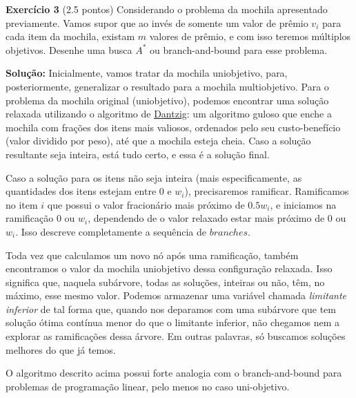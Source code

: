 \noindent \textbf{Exercício 3} (2.5 pontos) Considerando o problema da mochila apresentado
previamente. Vamos supor que ao invés de somente um valor de prêmio
$v_i$ para cada item da mochila, existam $m$ valores de prêmio, e com isso
teremos múltiplos objetivos. Desenhe uma busca $A^\ast$ ou branch-and-bound
para esse problema.

\bigskip

\noindent \textbf{Solução:}
Inicialmente, vamos tratar da mochila uniobjetivo, para, posteriormente, generalizar o resultado para a mochila multiobjetivo. Para o problema da mochila original (uniobjetivo), podemos encontrar uma solução relaxada utilizando o algoritmo de \href{https://en.wikipedia.org/wiki/Continuous_knapsack_problem}{Dantzig}: um algoritmo guloso que enche a mochila com frações dos itens mais valiosos, ordenados pelo seu custo-benefício (valor dividido por peso), até que a mochila esteja cheia. Caso a solução resultante seja inteira, está tudo certo, e essa é a solução final.

Caso a solução para os itens não seja inteira (mais especificamente, as quantidades dos itens estejam entre $0$ e $w_i$), precisaremos ramificar. Ramificamos no item $i$ que possui o valor fracionário mais próximo de $0.5w_i$, e iniciamos na ramificação $0$ ou $w_i$, dependendo de o valor relaxado estar mais próximo de  $0$ ou $w_i$. Isso descreve completamente a sequência de $branches$.

Toda vez que calculamos um novo nó após uma ramificação, também encontramos o valor da mochila uniobjetivo dessa configuração relaxada. Isso significa que, naquela subárvore, todas as soluções, inteiras ou não, têm, no máximo, esse mesmo valor. Podemos armazenar uma variável chamada \textit{limitante inferior} de tal forma que, quando nos deparamos com uma subárvore que tem solução ótima contínua menor do que o limitante inferior, não chegamos nem a explorar as ramificações dessa árvore. Em outras palavras, só buscamos soluções melhores do que já temos.

O algoritmo descrito acima possui forte analogia com o branch-and-bound para problemas de programação linear, pelo menos no caso uni-objetivo.


